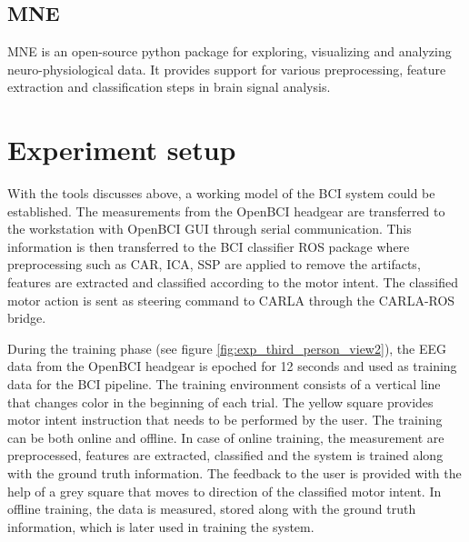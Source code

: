 \subsection{MNE}
MNE \cite{2013_MNE} is an open-source python package for exploring, visualizing and analyzing neuro-physiological data. It provides support for various preprocessing, feature extraction and classification steps in brain signal analysis.

\section{Experiment setup} 
With the tools discusses above, a working model of the BCI system could be established. The measurements from the OpenBCI headgear are transferred to the workstation with OpenBCI GUI through serial communication. This information is then transferred to the BCI classifier ROS package where preprocessing such as CAR, ICA, SSP are applied to remove the artifacts, features are extracted and classified according to the motor intent. The classified motor action is sent as steering command to CARLA through the CARLA-ROS bridge. 

During the training phase (see figure \ref{fig:exp_third_person_view2}), the EEG data from the OpenBCI headgear is epoched for 12 seconds and used as training data for the BCI pipeline. The training environment consists of a vertical line that changes color in the beginning of each trial. The yellow square provides motor intent instruction that needs to be performed by the user. The training can be both online and offline. In case of online training, the measurement are preprocessed, features are extracted, classified and the system is trained along with the ground truth information. The feedback to the user is provided with the help of a grey square that moves to direction of the classified motor intent. In offline training, the data is measured, stored along with the ground truth information, which is later used in training the system.

